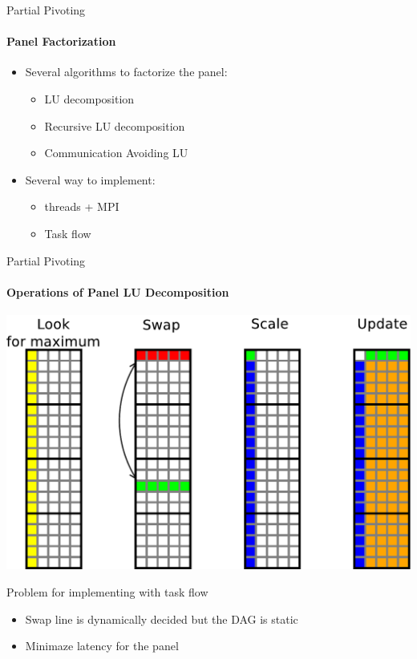 \begin{frame}{Partial Pivoting}
\framesubtitle{Panel Factorization}
\begin{itemize}
\item Several algorithms to factorize the panel:
\begin{itemize}
\item LU decomposition
\item Recursive LU decomposition
\item Communication Avoiding LU
\end{itemize}
\item Several way to implement:
\begin{itemize}
\item threads + MPI
\item Task flow
\end{itemize}
\end{itemize}
\end{frame}


\begin{frame}{Partial Pivoting}
\framesubtitle{Operations of Panel LU Decomposition}
\begin{center}
\includegraphics[scale=0.3]{panel_operation.pdf}
\end{center}
\pause
\begin{exampleblock}{Problem for implementing with task flow}
\begin{itemize}
\item Swap line is dynamically decided but the DAG is static
\item Minimaze latency for the panel
\end{itemize}
\end{exampleblock}{}
\end{frame}




